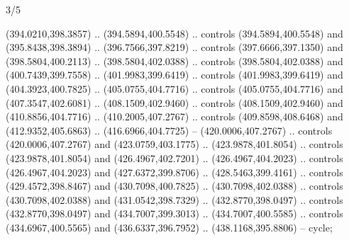 \begin{flagdescription}{3/5}
\begin{scope}[shift={(0.5\flaglength,0.5\flagwidth)},scale=\flagwidth/510]
\begin{scope}[y=0.80pt, x=0.80pt, yscale=-1.06, xscale=1.06,yshift=-240pt,xshift=-400pt]
\begin{scope}[cm={{0.83333,0.0,0.0,0.83333,(154.64672,48.64761)}}]
  (394.0210,398.3857) .. (394.5894,400.5548) .. controls (394.5894,400.5548) and
  (395.8438,398.3894) .. (396.7566,397.8219) .. controls (397.6666,397.1350) and
  (398.5804,400.2113) .. (398.5804,402.0388) .. controls (398.5804,402.0388) and
  (400.7439,399.7558) .. (401.9983,399.6419) .. controls (401.9983,399.6419) and
  (404.3923,400.7825) .. (405.0755,404.7716) .. controls (405.0755,404.7716) and
  (407.3547,402.6081) .. (408.1509,402.9460) .. controls (408.1509,402.9460) and
  (410.8856,404.7716) .. (410.2005,407.2767) .. controls (409.8598,408.6468) and
  (412.9352,405.6863) .. (416.6966,404.7725) -- (420.0006,407.2767) .. controls
  (420.0006,407.2767) and (423.0759,403.1775) .. (423.9878,401.8054) .. controls
  (423.9878,401.8054) and (426.4967,402.7201) .. (426.4967,404.2023) .. controls
  (426.4967,404.2023) and (427.6372,399.8706) .. (428.5463,399.4161) .. controls
  (429.4572,398.8467) and (430.7098,400.7825) .. (430.7098,402.0388) .. controls
  (430.7098,402.0388) and (431.0542,398.7329) .. (432.8770,398.0497) .. controls
  (432.8770,398.0497) and (434.7007,399.3013) .. (434.7007,400.5585) .. controls
  (434.6967,400.5565) and (436.6337,396.7952) .. (438.1168,395.8806) -- cycle;
\end{scope}
\end{scope}
\end{scope}
\fi
\framecode{}
\end{flagdescription}
